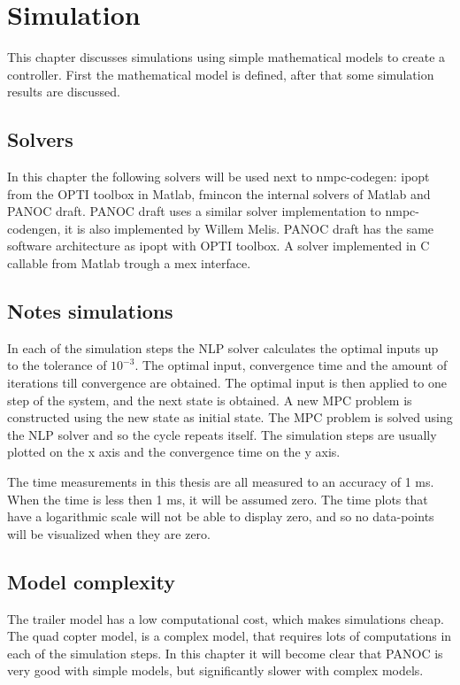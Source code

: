\chapter{Simulation}
This chapter discusses simulations using simple mathematical models to create a controller. First the mathematical model is defined, after that some simulation results are discussed.

\section{Solvers}
In this chapter the following solvers will be used next to nmpc-codegen: ipopt from the OPTI toolbox in Matlab, fmincon the internal solvers of Matlab and PANOC draft. PANOC draft uses a similar solver implementation to nmpc-codengen, it is also implemented by Willem Melis. PANOC draft has the same software architecture as ipopt with OPTI toolbox. A solver implemented in C callable from Matlab trough a mex interface.

\section{Notes simulations}
In each of the simulation steps the NLP solver calculates the optimal inputs up to the tolerance of $10^{-3}$. The optimal input, convergence time and the amount of iterations till convergence are obtained. The optimal input is then applied to one step of the system, and the next state is obtained. A new MPC problem is constructed using the new state as initial state. The MPC problem is solved using the NLP solver and so the cycle repeats itself. The simulation steps are usually plotted on the x axis and the convergence time on the y axis.

The time measurements in this thesis are all measured to an accuracy of 1 ms. When the time is less then 1 ms, it will be assumed zero. The time plots that have a logarithmic scale will not be able to display zero, and so no data-points will be visualized when they are zero.

\section{Model complexity}
The trailer model has a low computational cost, which makes simulations cheap. The quad copter model, is a complex model, that requires lots of computations in each of the simulation steps. In this chapter it will become clear that PANOC is very good with simple models, but significantly slower with complex models.

